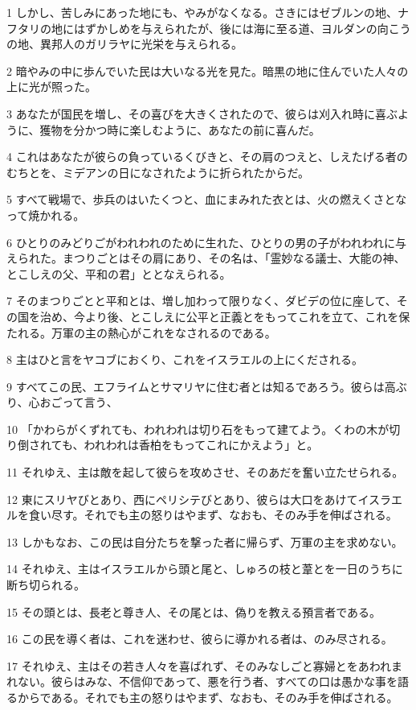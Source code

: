 \par 1 しかし、苦しみにあった地にも、やみがなくなる。さきにはゼブルンの地、ナフタリの地にはずかしめを与えられたが、後には海に至る道、ヨルダンの向こうの地、異邦人のガリラヤに光栄を与えられる。
\par 2 暗やみの中に歩んでいた民は大いなる光を見た。暗黒の地に住んでいた人々の上に光が照った。
\par 3 あなたが国民を増し、その喜びを大きくされたので、彼らは刈入れ時に喜ぶように、獲物を分かつ時に楽しむように、あなたの前に喜んだ。
\par 4 これはあなたが彼らの負っているくびきと、その肩のつえと、しえたげる者のむちとを、ミデアンの日になされたように折られたからだ。
\par 5 すべて戦場で、歩兵のはいたくつと、血にまみれた衣とは、火の燃えくさとなって焼かれる。
\par 6 ひとりのみどりごがわれわれのために生れた、ひとりの男の子がわれわれに与えられた。まつりごとはその肩にあり、その名は、「霊妙なる議士、大能の神、とこしえの父、平和の君」ととなえられる。
\par 7 そのまつりごとと平和とは、増し加わって限りなく、ダビデの位に座して、その国を治め、今より後、とこしえに公平と正義とをもってこれを立て、これを保たれる。万軍の主の熱心がこれをなされるのである。
\par 8 主はひと言をヤコブにおくり、これをイスラエルの上にくだされる。
\par 9 すべてこの民、エフライムとサマリヤに住む者とは知るであろう。彼らは高ぶり、心おごって言う、
\par 10 「かわらがくずれても、われわれは切り石をもって建てよう。くわの木が切り倒されても、われわれは香柏をもってこれにかえよう」と。
\par 11 それゆえ、主は敵を起して彼らを攻めさせ、そのあだを奮い立たせられる。
\par 12 東にスリヤびとあり、西にペリシテびとあり、彼らは大口をあけてイスラエルを食い尽す。それでも主の怒りはやまず、なおも、そのみ手を伸ばされる。
\par 13 しかもなお、この民は自分たちを撃った者に帰らず、万軍の主を求めない。
\par 14 それゆえ、主はイスラエルから頭と尾と、しゅろの枝と葦とを一日のうちに断ち切られる。
\par 15 その頭とは、長老と尊き人、その尾とは、偽りを教える預言者である。
\par 16 この民を導く者は、これを迷わせ、彼らに導かれる者は、のみ尽される。
\par 17 それゆえ、主はその若き人々を喜ばれず、そのみなしごと寡婦とをあわれまれない。彼らはみな、不信仰であって、悪を行う者、すべての口は愚かな事を語るからである。それでも主の怒りはやまず、なおも、そのみ手を伸ばされる。
